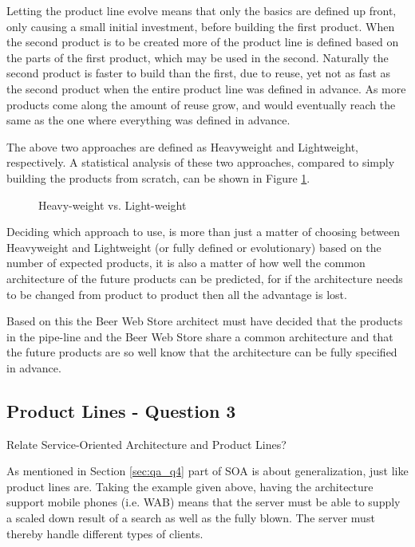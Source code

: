 Letting the product line evolve means that only the basics are defined up front, only causing a small initial investment, before building the first product. When the second product is to be created more of the product line is defined based on the parts of the first product, which may be used in the second. Naturally the second product is faster to build than the first, due to reuse, yet not as fast as the second product when the entire product line was defined in advance. As more products come along the amount of reuse grow, and would eventually reach the same as the one where everything was defined in advance.

The above two approaches are defined as Heavyweight and Lightweight, respectively. A statistical analysis of these two approaches, compared to simply building the products from scratch, can be shown in Figure \ref{fig:product-line}.

\begin{figure}[!htb]
\centerline{}
\caption{Heavy-weight vs. Light-weight}
\label{fig:product-line}
\end{figure}

Deciding which approach to use, is more than just a matter of choosing between Heavyweight and Lightweight (or fully defined or evolutionary) based on the number of expected products, it is also a matter of how well the common architecture of the future products can be predicted, for if the architecture needs to be changed from product to product then all the advantage is lost.

Based on this the Beer Web Store architect must have decided that the products in the pipe-line and the Beer Web Store share a common architecture and that the future products are so well know that the architecture can be fully specified in advance.

\subsection{Product Lines - Question 3}

\begin{question}
Relate Service-Oriented Architecture and Product Lines?
\end{question}

As mentioned in Section \ref{sec:qa_q4} part of SOA is about generalization, just like product lines are. Taking the example given above, having the architecture support mobile phones (i.e. WAB) means that the server must be able to supply a scaled down result of a search as well as the fully blown. The server must thereby handle different types of clients.

